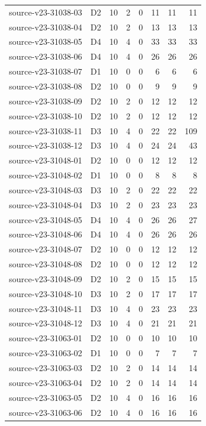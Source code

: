 \begin{longtable}{p{}lrrrrrr}
source-v23-31038-03 & D2 & 10 & 2 & 0 & 11 & 11 & 11\\
source-v23-31038-04 & D2 & 10 & 2 & 0 & 13 & 13 & 13\\
source-v23-31038-05 & D4 & 10 & 4 & 0 & 33 & 33 & 33\\
source-v23-31038-06 & D4 & 10 & 4 & 0 & 26 & 26 & 26\\
source-v23-31038-07 & D1 & 10 & 0 & 0 & 6 & 6 & 6\\
source-v23-31038-08 & D2 & 10 & 0 & 0 & 9 & 9 & 9\\
source-v23-31038-09 & D2 & 10 & 2 & 0 & 12 & 12 & 12\\
source-v23-31038-10 & D2 & 10 & 2 & 0 & 12 & 12 & 12\\
source-v23-31038-11 & D3 & 10 & 4 & 0 & 22 & 22 & 109\\
source-v23-31038-12 & D3 & 10 & 4 & 0 & 24 & 24 & 43\\
source-v23-31048-01 & D2 & 10 & 0 & 0 & 12 & 12 & 12\\
source-v23-31048-02 & D1 & 10 & 0 & 0 & 8 & 8 & 8\\
source-v23-31048-03 & D3 & 10 & 2 & 0 & 22 & 22 & 22\\
source-v23-31048-04 & D3 & 10 & 2 & 0 & 23 & 23 & 23\\
source-v23-31048-05 & D4 & 10 & 4 & 0 & 26 & 26 & 27\\
source-v23-31048-06 & D4 & 10 & 4 & 0 & 26 & 26 & 26\\
source-v23-31048-07 & D2 & 10 & 0 & 0 & 12 & 12 & 12\\
source-v23-31048-08 & D2 & 10 & 0 & 0 & 12 & 12 & 12\\
source-v23-31048-09 & D2 & 10 & 2 & 0 & 15 & 15 & 15\\
source-v23-31048-10 & D3 & 10 & 2 & 0 & 17 & 17 & 17\\
source-v23-31048-11 & D3 & 10 & 4 & 0 & 23 & 23 & 23\\
source-v23-31048-12 & D3 & 10 & 4 & 0 & 21 & 21 & 21\\
source-v23-31063-01 & D2 & 10 & 0 & 0 & 10 & 10 & 10\\
source-v23-31063-02 & D1 & 10 & 0 & 0 & 7 & 7 & 7\\
source-v23-31063-03 & D2 & 10 & 2 & 0 & 14 & 14 & 14\\
source-v23-31063-04 & D2 & 10 & 2 & 0 & 14 & 14 & 14\\
source-v23-31063-05 & D2 & 10 & 4 & 0 & 16 & 16 & 16\\
source-v23-31063-06 & D2 & 10 & 4 & 0 & 16 & 16 & 16\\

\end{longtable}
